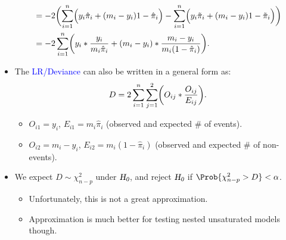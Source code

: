 \documentclass{article}\usepackage[]{graphicx}\usepackage[svgnames]{xcolor}
\let\log\relax%
\newcommand{\HN}{\textsl{H}_{\textsl{0}}}%
\begin{document}
\begin{itemize}
\begin{align*}
                   & =-2\biggl(\sum_{i=1}^{n}\Bigl(y_i\log{\hat{\pi}_i}+(m_i-y_i)\log{1-\hat{\pi}_i}\Bigr)
                  -\sum_{i=1}^{n}\Bigl(y_i\log{\tilde{\pi}_i}+(m_i-y_i)\log{1-\tilde{\pi}_i}\Bigr)\biggr)                                       \\
                   & =-2 \sum_{i=1}^{n} \biggl(y_i\log*{\frac{y_i}{m_i\hat{\pi}_i}}+(m_i-y_i)\log*{\frac{m_i-y_i}{m_i(1-\hat{\pi}_i)} }\biggr).
            \end{align*}
      \item The \textcolor{Blue}{LR/Deviance} can also be written in a general form as:
            \[ D=2 \sum_{i=1}^{n} \sum_{j=1}^{2} \biggl(O_{ij}\log*{\frac{O_{ij}}{E_{ij}}}\biggr). \]
            \begin{itemize}
                  \item $ O_{i1}=y_i $, $ E_{i1}=m_i\hat{\pi}_i $ (observed and expected \# of events).
                  \item $ O_{i2}=m_i-y_i $, $ E_{i2}=m_i(1-\hat{\pi}_i) $ (observed and expected \# of non-events).
            \end{itemize}
      \item We expect $ D \sim \chi^2_{n-p} $ under $ \HN $, and reject $ \HN $ if $ \Prob{\chi^2_{n-p}>D}<\alpha $.
            \begin{itemize}
                  \item Unfortunately, this is not a great approximation.
                  \item Approximation is much better for testing nested unsaturated models though.
            \end{itemize}
\end{itemize}
\end{document}
